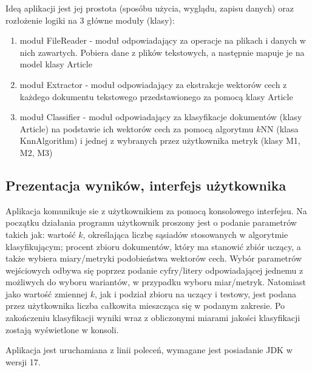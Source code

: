 \documentclass{classrep}
\begin{document}
Ideą aplikacji jest jej prostota (sposóbu użycia, wyglądu, zapisu danych) oraz rozłożenie logiki na 3 główne moduły (klasy): 
\begin{enumerate}
\item moduł FileReader - moduł odpowiadający za operacje na plikach i danych w nich zawartych. Pobiera dane z plików tekstowych, \cite{teksty} a następnie mapuje je na model klasy Article
\item moduł Extractor - moduł odpowiadający za ekstrakcje wektorów cech z każdego dokumentu tekstowego przedstawionego za pomocą klasy Article
\item moduł Classifier - moduł odpowiadający za klasyfikacje dokumentów (klasy Article) na podstawie ich wektorów cech za pomocą algorytmu \(k\)NN \cite{tadeusiewicz90} (klasa KnnAlgorithm) i jednej z wybranych przez użytkownika metryk (klasy M1, M2, M3)
\end{enumerate}

\subsection{Prezentacja wyników, interfejs użytkownika}  
Aplikacja komunikuje sie z użytkownikiem za pomocą konsolowego interfejsu. Na początku działania programu użytkownik proszony jest o podanie parametrów takich jak:  
wartość $k$, określająca liczbę sąsiadów stosowanych w algorytmie klasyfikującym; 
procent zbioru dokumentów, który ma stanowić zbiór uczący, a także wybiera miary/metryki podobieństwa wektorów cech. Wybór parametrów wejściowych odbywa się poprzez podanie
cyfry/litery odpowiadającej jednemu z możliwych do wyboru wariantów, w przypadku wyboru miar/metryk. Natomiast jako wartość zmiennej $k$, jak i podział zbioru na uczący i testowy, jest podana przez użytkownika liczba całkowita mieszcząca się w podanym zakresie.
Po zakończeniu klasyfikacji wyniki wraz z obliczonymi miarami jakości klasyfikacji zostają wyświetlone w konsoli.

Aplikacja jest uruchamiana z linii poleceń, wymagane jest posiadanie JDK w wersji 17. 

\end{document}
